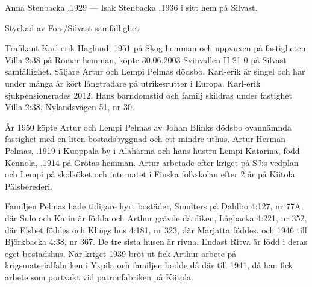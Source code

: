 Anna Stenbacka .1929  ---  Isak Stenbacka .1936 i sitt hem på Silvast.




Styckad av Fors/Silvast samfällighet


Trafikant Karl-erik Haglund,  1951 på Skog hemman och uppvuxen på fastigheten Villa 2:38 på Romar hemman, köpte 30.06.2003 Svinvallen II 21-0 på Silvast samfällighet. Säljare Artur och Lempi Pelmas dödsbo. Karl-erik är singel och har under många år kört långtradare på utrikesrutter i Europa. Karl-erik sjukpensionerades 2012. Hans barndomstid och familj skildras under fastighet Villa 2:38, Nylandsvägen 51, nr 30.


År 1950 köpte Artur och Lempi Pelmas av Johan Blinks dödsbo ovannämnda fastighet med en liten bostadsbyggnad och ett mindre uthus. Artur Herman Pelmas, .1919 i Kuoppala by i Alahärmä och hans hustru Lempi Katarina, född Kennola, .1914 på Grötas hemman. Artur arbetade efter kriget på SJ:s vedplan och Lempi på skolköket och internatet i Finska folkskolan efter 2 år på Kiitola 	Pälsberederi.
\begin{jhchildren}
  \item {}
  \item {}
  \item {}
  \item {}
  \item {}
\end{jhchildren}
Familjen Pelmas hade tidigare hyrt bostäder, Smulters på Dahlbo 4:127, nr 77A, där Sulo och Karin är födda och Arthur grävde då diken, Lågbacka 4:221, nr 352, där Elsbet föddes och Klings hus 4:181, nr 323, där Marjatta föddes, och 1946 till Björkbacka 4:38, nr 367. De tre sista husen är rivna. Endast Ritva är född i deras eget bostadshus. När kriget 1939 bröt ut fick Arthur arbete på krigsmaterialfabriken i Yxpila och familjen bodde då där till 1941, då han fick arbete som portvakt vid patronfabriken på Kiitola.

